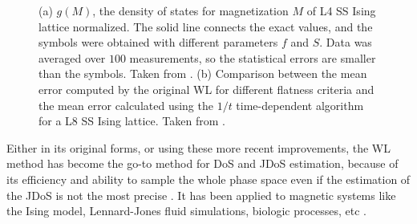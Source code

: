 
\begin{figure}[ht]
\centering
{}
\quad
{}

\caption{(a) $g(M)$, the density of states for magnetization $M$ of L4 SS Ising lattice normalized. The solid line connects the exact values, and the symbols were obtained with different parameters $f$ and $S$. Data was averaged over $100$ measurements, so the statistical errors are smaller than the symbols. Taken from \cite{Zhou2005}.  (b) Comparison between the mean error computed by the original WL for different flatness criteria and the mean error calculated using the $1/t$ time-dependent algorithm for a L8 SS Ising lattice. Taken from \cite{Belardinelli2007}.}

\end{figure}


Either in its original forms, or using these more recent improvements, the WL method has become the go-to method for DoS and JDoS estimation, because of its efficiency and ability to sample the whole phase space even if the estimation of the JDoS is not the most precise \cite{Zhou2005, Belardinelli2007}. It has been applied to magnetic systems like the Ising model, Lennard-Jones fluid simulations, biologic processes, etc \cite{Maerzke2014, Yan2002,Yan2003}.












